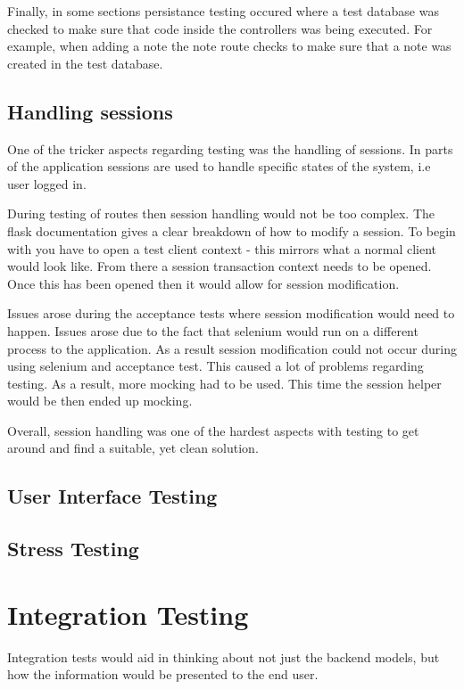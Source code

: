 Finally, in some sections persistance testing occured where a test database was checked to make sure that code inside the controllers was being executed. For example, when adding a note the note route checks to make sure that a note was created in the test database.

\subsection{Handling sessions}
One of the tricker aspects regarding testing was the handling of sessions. In parts of the application sessions are used to handle specific states of the system, i.e user logged in.

During testing of routes then session handling would not be too complex. The flask documentation gives a clear breakdown of how to modify a session. To begin with you have to open a test client context - this mirrors what a normal client would look like. From there a session transaction context needs to be opened. Once this has been opened then it would allow for session modification.

Issues arose during the acceptance tests where session modification would need to happen. Issues arose due to the fact that selenium would run on a different process to the application. As a result session modification could not occur during using selenium and acceptance test. This caused a lot of problems regarding testing. As a result, more mocking had to be used. This time the session helper would be then ended up mocking.

Overall, session handling was one of the hardest aspects with testing to get around and find a suitable, yet clean solution.

\subsection{User Interface Testing}

\subsection{Stress Testing}

\section{Integration Testing}
Integration tests would aid in thinking about not just the backend models, but how the information would be presented to the end user.

